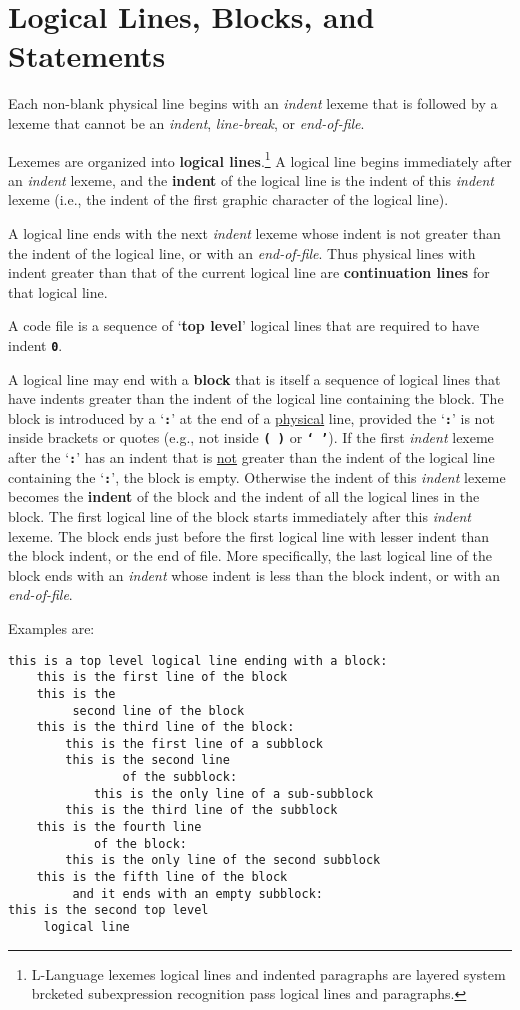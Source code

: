 \documentclass[12pt]{article}
\newcommand{\TT}[1]{{\tt \bfseries #1}}
\newcommand{\key}[1]{{\rm \bfseries #1}}
\newcommand{\skey}[2]{{\rm \bfseries #1#2}}
\newenvironment{indpar}[1][0.3in]%
	{\begin{list}{}%
		     {\setlength{\itemsep}{0in}%
		      \setlength{\topsep}{0in}%
		      \setlength{\parsep}{1ex}%
		      \setlength{\labelwidth}{#1}%
		      \setlength{\leftmargin}{#1}%
		      \addtolength{\leftmargin}{\labelsep}}%
	 \item}%
	{\end{list}}
\begin{document}
\section{Logical Lines, Blocks, and Statements}
\label{LOGICAL-LINES-BLOCKS-AND-STATEMENTS}

Each non-blank physical line begins with an {\em indent} lexeme
that is followed by a
lexeme that cannot be an {\em indent}, {\em line-break}, or
{\em end-of-file}.

Lexemes are organized into \skey{logical line}s.\footnote{
L-Language lexemes logical lines and indented paragraphs are
layered system brcketed subexpression recognition pass
logical lines and paragraphs.}
A logical line
begins immediately after an {\em indent} lexeme, and the
\key{indent} of the logical line is the
indent of this {\em indent} lexeme (i.e., the indent of the
first graphic character of the logical line).

A logical line ends with the next {\em indent} lexeme whose indent
is not greater than the indent of the logical line, or with an
{\em end-of-file}.  Thus physical
lines with indent greater than that of the current logical line
are \skey{continuation line}s for that logical line.

A code file is a sequence of `\key{top level}' logical lines that
are required to have indent \TT{0}.

A logical line may end with a \key{block} that is itself a sequence of
logical lines that have indents greater than the indent of the
logical line containing the block.
The block is introduced by a `\TT{:}' at the end
of a \underline{physical} line, provided the `\TT{:}' is not inside brackets
or quotes
(e.g., not inside \TT{(~)} or \TT{`~'}).
If the first {\em indent} lexeme after the
`\TT{:}' has an indent that is \underline{not} greater than the indent
of the logical line containing the `\TT{:}', the block is empty.
Otherwise the indent of this {\em indent} lexeme becomes the
\key{indent} of the block and the indent of all the
logical lines in the block.  The first logical line of the block
starts immediately after this {\em indent} lexeme.
The block ends just before the first
logical line with lesser indent than the block indent, or the end of file.
More specifically, the last logical line of the block ends with an
{\em indent} whose indent is less than the block indent, or with an
{\em end-of-file}.

Examples are:
\begin{indpar}\begin{verbatim}
this is a top level logical line ending with a block:
    this is the first line of the block
    this is the
         second line of the block
    this is the third line of the block:
        this is the first line of a subblock
        this is the second line
                of the subblock:
            this is the only line of a sub-subblock
        this is the third line of the subblock
    this is the fourth line
            of the block:
        this is the only line of the second subblock
    this is the fifth line of the block
         and it ends with an empty subblock:
this is the second top level
     logical line
\end{verbatim}\end{indpar}
\end{document}
